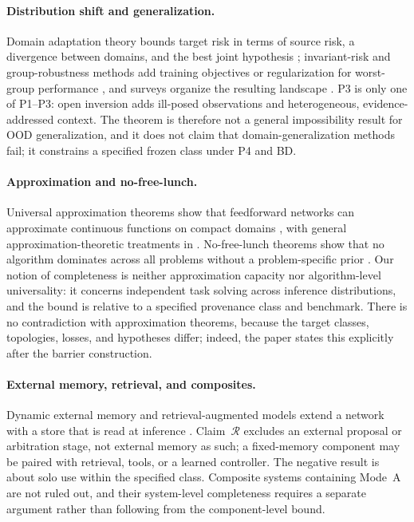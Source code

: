 \documentclass[twoside,11pt]{article}
\begin{document}
\paragraph{Distribution shift and generalization.}
Domain adaptation theory bounds target risk in terms of source risk, a divergence between domains, and the best joint hypothesis \citep{bendavid2010}; invariant-risk and group-robustness methods add training objectives or regularization for worst-group performance \citep{arjovsky2019,sagawa2020}, and surveys organize the resulting landscape \citep{zhou2022,gulrajani2021,yang2024}. P3 is only one of P1--P3: open inversion adds ill-posed observations and heterogeneous, evidence-addressed context. The theorem is therefore not a general impossibility result for OOD generalization, and it does not claim that domain-generalization methods fail; it constrains a specified frozen class under P4 and BD.

\paragraph{Approximation and no-free-lunch.}
Universal approximation theorems show that feedforward networks can approximate continuous functions on compact domains \citep{cybenko1989,hornik1989}, with general approximation-theoretic treatments in \citet{pinkus1985}. No-free-lunch theorems show that no algorithm dominates across all problems without a problem-specific prior \citep{wolpert1996,wolpert1997,adam2019}. Our notion of completeness is neither approximation capacity nor algorithm-level universality: it concerns independent task solving across inference distributions, and the bound is relative to a specified provenance class and benchmark. There is no contradiction with approximation theorems, because the target classes, topologies, losses, and hypotheses differ; indeed, the paper states this explicitly after the barrier construction.

\paragraph{External memory, retrieval, and composites.}
Dynamic external memory and retrieval-augmented models extend a network with a store that is read at inference \citep{graves2016,lewis2020}. Claim~$\mathcal{R}$ excludes an external proposal or arbitration stage, not external memory as such; a fixed-memory component may be paired with retrieval, tools, or a learned controller. The negative result is about solo use within the specified class. Composite systems containing Mode~A are not ruled out, and their system-level completeness requires a separate argument rather than following from the component-level bound.
\end{document}
